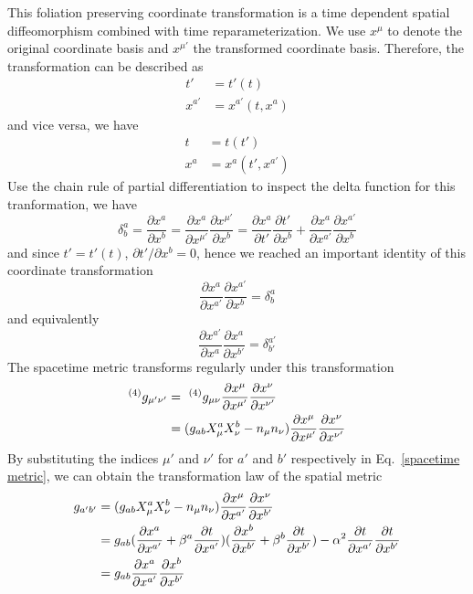 \documentclass[letterpaper,nofootinbib,prd,amsmath,onecolumn]{revtex4-1}
\begin{document}
This foliation preserving coordinate transformation is a time dependent spatial diffeomorphism combined with time reparameterization. We use $x^{\mu}$ to denote the original coordinate basis and $x^{\mu'}$ the transformed coordinate basis. Therefore, the transformation can be described as
\begin{align*}
t' & = t'(t)\\
x^{a'} & = x^{a'}(t,x^{a})
\end{align*}
and vice versa, we have
\begin{align*}
t & = t(t')\\
x^{a} & = x^{a}(t',x^{a'})
\end{align*}
Use the chain rule of partial differentiation to inspect the delta function for this tranformation, we have
\[
\delta^{a}_{b} = \frac{\partial x^{a}}{\partial x^{b}} = \frac{\partial x^{a}}{\partial x^{\mu'}}\frac{\partial x^{\mu'}}{\partial x^{b}} = \frac{\partial x^{a}}{\partial t'}\frac{\partial t'}{\partial x^{b}} + \frac{\partial x^{a}}{\partial x^{a'}}\frac{\partial x^{a'}}{\partial x^{b}}
\]
and since $t' = t'(t)$, $\partial t'/\partial x^{b} = 0$, hence we reached an important identity of this coordinate transformation
\begin{equation}
\frac{\partial x^{a}}{\partial x^{a'}}\frac{\partial x^{a'}}{\partial x^{b}} = \delta^{a}_{b}
\end{equation}
and equivalently
\begin{equation}
\frac{\partial x^{a'}}{\partial x^{a}}\frac{\partial x^{a}}{\partial x^{b'}} = \delta^{a'}_{b'}
\end{equation}
The spacetime metric transforms regularly under this transformation
\begin{align}\label{spacetime metric}
^{(4)}g_{\mu'\nu'} &=~^{(4)}g_{\mu\nu}\frac{\partial x^{\mu}}{\partial x^{\mu'}}\frac{\partial x^{\nu}}{\partial x^{\nu'}}\notag\\
& = (g_{ab}X^{a}_{\mu}X^{b}_{\nu} - n_{\mu}n_{\nu})\frac{\partial x^{\mu}}{\partial x^{\mu'}}\frac{\partial x^{\nu}}{\partial x^{\nu'}}
\end{align}
By substituting the indices $\mu'$ and $\nu'$ for $a'$ and $b'$ respectively in Eq.~\ref{spacetime metric}, we can obtain the transformation law of the spatial metric
\begin{align}
g_{a'b'} & = (g_{ab}X^{a}_{\mu}X^{b}_{\nu} - n_{\mu}n_{\nu})\frac{\partial x^{\mu}}{\partial x^{a'}}\frac{\partial x^{\nu}}{\partial x^{b'}}\notag\\
&= g_{ab}(\frac{\partial x^{a}}{\partial x^{a'}} + \beta^{a}\frac{\partial t}{\partial x^{a'}})(\frac{\partial x^{b}}{\partial x^{b'}} + \beta^{b}\frac{\partial t}{\partial x^{b'}}) - \alpha^2\frac{\partial t}{\partial x^{a'}}\frac{\partial t}{\partial x^{b'}}\notag\\
& = g_{ab}\frac{\partial x^{a}}{\partial x^{a'}}\frac{\partial x^{b}}{\partial x^{b'}}
\end{align}
\end{document}
